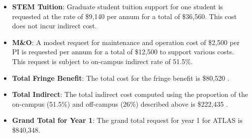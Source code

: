 \begin{itemize}
\item {{\bf STEM Tuition}: Graduate student tuition support for one student is requested at the rate of \$9,140 per annum for a total of \$36,560.  This cost does not incur indirect cost.}

\item {{\bf M\&O}: A modest request for maintenance and operation cost of \$2,500 per PI is requested per annum for a total of \$12,500 to support various costs. This request is subject to on-campus indirect rate of 51.5\%.}

\item {{\bf Total Fringe Benefit}: The total cost for the fringe benefit is \$80,520 .}

\item {{\bf Total Indirect}: The total indirect cost computed using the proportion of the on-campus (51.5\%) and off-campus (26\%) described above is \$222,435 .}

\item {{\bf Grand Total for Year 1}: The grand total request for year 1 for ATLAS is \$840,348.}

\end{itemize}

